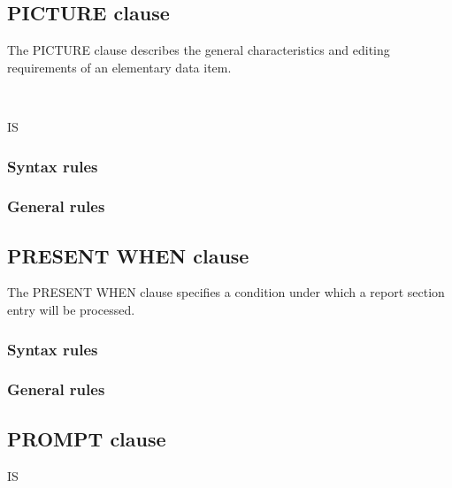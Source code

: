 \subsection{PICTURE clause}

The PICTURE clause describes the general characteristics and editing requirements of an elementary data item.

\begin{syntax}
  \begin{1=}
     \\
  \end{1=}
  IS 
\end{syntax}

\subsubsection{Syntax rules}

\subsubsection{General rules}

\subsection{PRESENT WHEN clause}

The PRESENT WHEN clause specifies a condition under which a report section entry will be processed.

\begin{syntax}
    \condition
\end{syntax}

\subsubsection{Syntax rules}

\subsubsection{General rules}

\subsection{PROMPT clause}

\begin{syntax}[\miscextcolour]
  \begin{0-1}
     IS
    \begin{1=}
      \identifier \\
      \literal
    \end{1=}
  \end{0-1}
\end{syntax}

